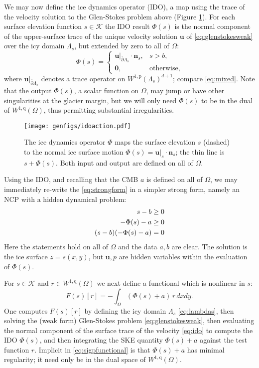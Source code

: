 \documentclass[letterpaper,final,12pt,reqno]{amsart}
\theoremstyle{claim}
\newcommand{\bn}{\mathbf{n}}
\newcommand{\bu}{\mathbf{u}}
\newcommand{\bzero}{\bm{0}}
\newcommand{\pp}{{\text{p}}}
\newcommand{\qq}{{\text{q}}}
\numberwithin{equation}{section}
\numberwithin{figure}{section}
\numberwithin{table}{section}
\numberwithin{theorem}{section}
\begin{document}
We may now define the ice dynamics operator (IDO), a map using the trace of the velocity solution to the Glen-Stokes problem above (Figure \ref{fig:idoaction}).  For each surface elevation function $s \in \mathcal{K}$ the IDO result $\Phi(s)$ is the normal component of the upper-surface trace of the unique velocity solution $\bu$ of \eqref{eq:glenstokesweak} over the icy domain $\Lambda_s$, but extended by zero to all of $\Omega$:
\begin{equation}
\Phi(s) = \begin{cases} \bu|_{\overline{\partial} \Lambda_s} \cdot \bn_s, & s > b, \\
                        \bzero, & \text{otherwise}, \end{cases} \label{eq:ido}
\end{equation}
where $\bu|_{\overline{\partial} \Lambda_s}$ denotes a trace operator on $W^{1,\pp}(\Lambda_s)^{d+1}$; compare \eqref{eq:mixed}.  Note that the output $\Phi(s)$, a scalar function on $\Omega$, may jump or have other singularities at the glacier margin, but we will only need $\Phi(s)$ to be in the dual of $W^{1,\qq}(\Omega)$, thus permitting substantial irregularities.

\begin{figure}[t]
\begin{center}
\texttt{[image: genfigs/idoaction.pdf]}
\end{center}
\caption{The ice dynamics operator $\Phi$ maps the surface elevation $s$ (dashed) to the normal ice surface motion $\Phi(s)=\bu|_s \cdot \bn_s$; the thin line is $s+\Phi(s)$.  Both input and output are defined on all of $\Omega$.}
\label{fig:idoaction}
\end{figure}

Using the IDO, and recalling that the CMB $a$ is defined on all of $\Omega$, we may immediately re-write the \eqref{eq:strongform} in a simpler strong form, namely an NCP with a hidden dynamical problem:
\begin{align}
s - b &\ge 0  \label{eq:idostrongform} \\
- \Phi(s) - a &\ge 0 \notag \\
(s - b) (- \Phi(s) - a) &= 0 \notag
\end{align}
Here the statements hold on all of $\Omega$ and the data $a,b$ are clear.  The solution is the ice surface $z=s(x,y)$, but $\bu,p$ are hidden variables within the evaluation of $\Phi(s)$.

For $s \in \mathcal{K}$ and $r \in W^{1,\qq}(\Omega)$ we next define a functional which is nonlinear in $s$:
\begin{equation}
F(s)[r] = - \int_\Omega (\Phi(s) + a)\, r \,dx dy. \label{eq:sigpfunctional}
\end{equation}
One computes $F(s)[r]$ by defining the icy domain $\Lambda_s$ \eqref{eq:lambdas}, then solving the (weak form) Glen-Stokes problem \eqref{eq:glenstokesweak}, then evaluating the normal component of the surface trace of the velocity \eqref{eq:ido} to compute the IDO $\Phi(s)$, and then integrating the SKE quantity $\Phi(s) + a$ against the test function $r$.  Implicit in \eqref{eq:sigpfunctional} is that $\Phi(s) + a$ has minimal regularity; it need only be in the dual space of $W^{1,\qq}(\Omega)$.
\end{document}
